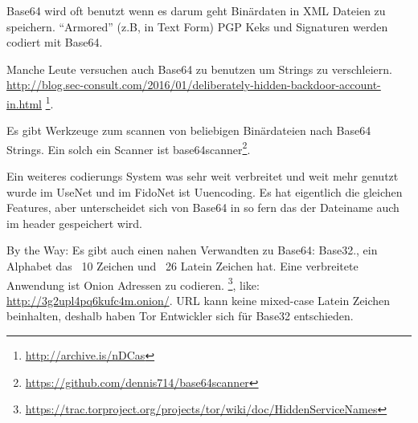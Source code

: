 Base64 wird oft benutzt wenn es darum geht Binärdaten in  XML Dateien zu speichern.
``Armored'' (z.B, in Text Form) PGP Keks und Signaturen werden codiert mit Base64.

Manche Leute versuchen auch Base64 zu benutzen um Strings zu verschleiern. 
\url{http://blog.sec-consult.com/2016/01/deliberately-hidden-backdoor-account-in.html}
\footnote{\url{http://archive.is/nDCas}}.

Es gibt Werkzeuge zum scannen von beliebigen Binärdateien nach Base64 Strings.
Ein solch ein Scanner ist base64scanner\footnote{\url{https://github.com/dennis714/base64scanner}}.

Ein weiteres codierungs System was sehr weit verbreitet und weit mehr genutzt wurde im UseNet und im 
FidoNet ist Uuencoding. Es hat eigentlich die gleichen Features, aber unterscheidet sich von Base64 
in so fern das der Dateiname auch im header gespeichert wird.

By the Way: Es gibt auch einen nahen Verwandten zu Base64: Base32., ein Alphabet das ~10 Zeichen und ~26 Latein Zeichen hat. 
Eine verbreitete Anwendung ist Onion Adressen zu codieren. 
\footnote{\url{https://trac.torproject.org/projects/tor/wiki/doc/HiddenServiceNames}},
like: \url{http://3g2upl4pq6kufc4m.onion/}.
\ac{URL} kann keine mixed-case Latein Zeichen beinhalten, deshalb haben Tor Entwickler sich für Base32 entschieden.
